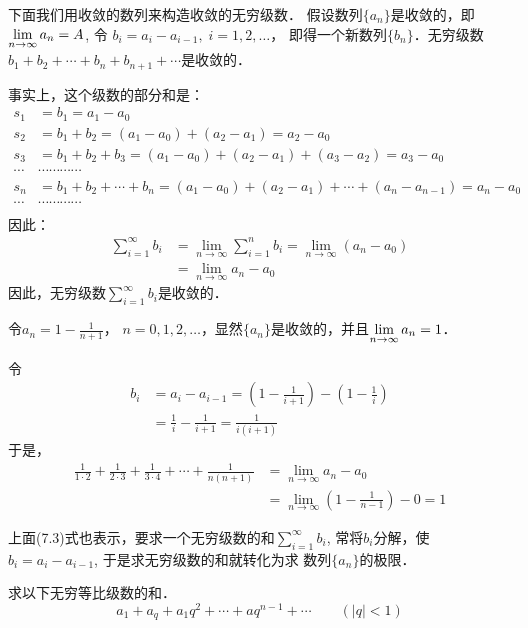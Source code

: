 下面我们用收敛的数列来构造收敛的无穷级数．
假设数列$\{a_n\}$是收敛的，即$\displaystyle\lim_{n\to\infty}a_n=A$, 令
$b_i=a_i-a_{i-1},\; i=1,2,\ldots$，
即得一个新数列$\{b_n\}$．无穷级数
$b_1+b_2+\cdots+b_n+b_{n+1}+\cdots$是收敛的．

事实上，这个级数的部分和是：
\[\begin{split}
    s_1&=b_1=a_1-a_0\\
    s_2&=b_1+b_2=(a_1-a_0)+(a_2-a_1)=a_2-a_0\\
    s_3&=b_1+b_2+b_3=(a_1-a_0)+(a_2-a_1)+(a_3-a_2)=a_3-a_0\\
    \cdots & \cdots\cdots\cdots\cdots\\
    s_n&=b_1+b_2+\cdots +b_n=(a_1-a_0)+(a_2-a_1)+\cdots +(a_n-a_{n-1})=a_n-a_0\\
    \cdots & \cdots\cdots\cdots\cdots\\
\end{split} \]
因此：
\begin{equation}
    \begin{split}
        \sum^{\infty}_{i=1}b_i&=\lim_{n\to\infty}\sum^n_{i=1}b_i=\lim_{n\to\infty}(a_n-a_0)\\
        &=\lim_{n\to\infty}a_n-a_0
    \end{split}
\end{equation}
因此，无穷级数$\sum^{\infty}_{i=1}b_i$是收敛的．


\begin{example}
令$a_n=1-\frac{1}{n+1}$， $n=0,1,2,\ldots$，显然$\{a_n\}$是收敛的，并且$\displaystyle\lim_{n\to \infty}a_n=1$．

令\[\begin{split}
    b_i&=a_{i}-a_{i-1}=\left(1-\frac{1}{i+1}\right)-\left(1-\frac{1}{i}\right)\\
    &=\frac{1}{i}-\frac{1}{i+1}=\frac{1}{i(i+1)}
\end{split}\]
于是，      
\[\begin{split}
    \frac{1}{1\cdot 2}+\frac{1}{2\cdot 3}+\frac{1}{3\cdot 4}+\cdots +\frac{1}{n(n+1)}&=\lim_{n\to\infty}a_n-a_0\\
    &=\lim_{n\to\infty}\left(1-\frac{1}{n-1}\right)-0=1
\end{split}\]

上面(7.3)式也表示，要求一个无穷级数的和$\sum^{\infty}_{i=1}b_i$, 常将$b_i$分解，使$b_i=a_i-a_{i-1}$, 于是求无穷级数的和就转化为求
数列$\{a_n\}$的极限．
\end{example}

\begin{example}
    求以下无穷等比级数的和．
    \[a_1+a_q+a_1q^2+\cdots +aq^{n-1}+\cdots \qquad (|q|<1)\]
\end{example}


